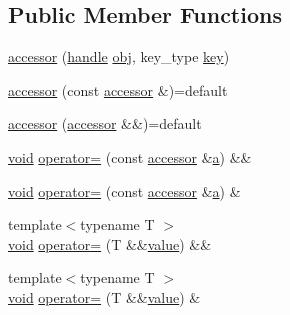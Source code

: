 \subsection*{Public Member Functions}
\begin{DoxyCompactItemize}
\item 
\mbox{\hyperlink{classaccessor_a7545c456f71e9d6265ed0ce54a104be1}{accessor}} (\mbox{\hyperlink{classhandle}{handle}} \mbox{\hyperlink{_s_d_l__opengl__glext_8h_a0c0d4701a6c89f4f7f0640715d27ab26}{obj}}, key\+\_\+type \mbox{\hyperlink{classaccessor_ac599d310f957d08a51d4cfc03fdef059}{key}})
\item 
\mbox{\hyperlink{classaccessor_aca9ebf02da5b9869397d12fbda0e8854}{accessor}} (const \mbox{\hyperlink{classaccessor}{accessor}} \&)=default
\item 
\mbox{\hyperlink{classaccessor_a60c29e25d1efacef831283af158fd16b}{accessor}} (\mbox{\hyperlink{classaccessor}{accessor}} \&\&)=default
\item 
\mbox{\hyperlink{_s_d_l__opengles2__gl2ext_8h_ae5d8fa23ad07c48bb609509eae494c95}{void}} \mbox{\hyperlink{classaccessor_a3d1b6cebd43e008d426f69e2440940a3}{operator=}} (const \mbox{\hyperlink{classaccessor}{accessor}} \&\mbox{\hyperlink{_s_d_l__opengl__glext_8h_a3309789fc188587d666cda5ece79cf82}{a}}) \&\&
\item 
\mbox{\hyperlink{_s_d_l__opengles2__gl2ext_8h_ae5d8fa23ad07c48bb609509eae494c95}{void}} \mbox{\hyperlink{classaccessor_a69d00cfba942eeeda666733bf8b3e420}{operator=}} (const \mbox{\hyperlink{classaccessor}{accessor}} \&\mbox{\hyperlink{_s_d_l__opengl__glext_8h_a3309789fc188587d666cda5ece79cf82}{a}}) \&
\item 
{\footnotesize template$<$typename T $>$ }\\\mbox{\hyperlink{_s_d_l__opengles2__gl2ext_8h_ae5d8fa23ad07c48bb609509eae494c95}{void}} \mbox{\hyperlink{classaccessor_a41751202ddf456a8e1a2829867073ea0}{operator=}} (T \&\&\mbox{\hyperlink{_s_d_l__opengl__glext_8h_a8ad81492d410ff2ac11f754f4042150f}{value}}) \&\&
\item 
{\footnotesize template$<$typename T $>$ }\\\mbox{\hyperlink{_s_d_l__opengles2__gl2ext_8h_ae5d8fa23ad07c48bb609509eae494c95}{void}} \mbox{\hyperlink{classaccessor_ac05d86a5bc5fcd789dca880f7fe961a1}{operator=}} (T \&\&\mbox{\hyperlink{_s_d_l__opengl__glext_8h_a8ad81492d410ff2ac11f754f4042150f}{value}}) \&
\end{DoxyCompactItemize}

